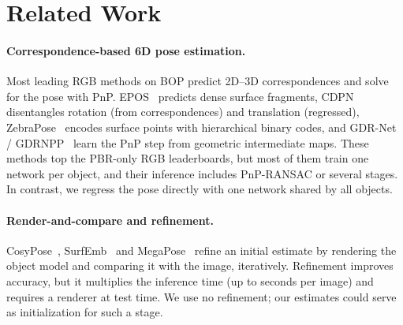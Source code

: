 \section{Related Work}
\label{sec:related}

\paragraph{Correspondence-based 6D pose estimation.}
Most leading RGB methods on BOP predict 2D--3D correspondences and solve for the pose with
PnP. EPOS~\cite{hodan2020epos} predicts dense surface fragments, CDPN~\cite{li2019cdpn}
disentangles rotation (from correspondences) and translation (regressed),
ZebraPose~\cite{su2022zebrapose} encodes surface points with hierarchical binary codes, and
GDR-Net / GDRNPP~\cite{wang2021gdrnet,liu2022gdrnpp} learn the PnP step from geometric
intermediate maps. These methods top the PBR-only RGB leaderboards, but most of them train one
network per object, and their inference includes PnP-RANSAC or several stages. In contrast, we
regress the pose directly with one network shared by all objects.

\paragraph{Render-and-compare and refinement.}
CosyPose~\cite{labbe2020cosypose}, SurfEmb~\cite{haugaard2022surfemb} and
MegaPose~\cite{labbe2022megapose} refine an initial estimate by rendering the object model and
comparing it with the image, iteratively. Refinement improves accuracy, but it multiplies the
inference time (up to seconds per image) and requires a renderer at test time. We use no
refinement; our estimates could serve as initialization for such a stage.

